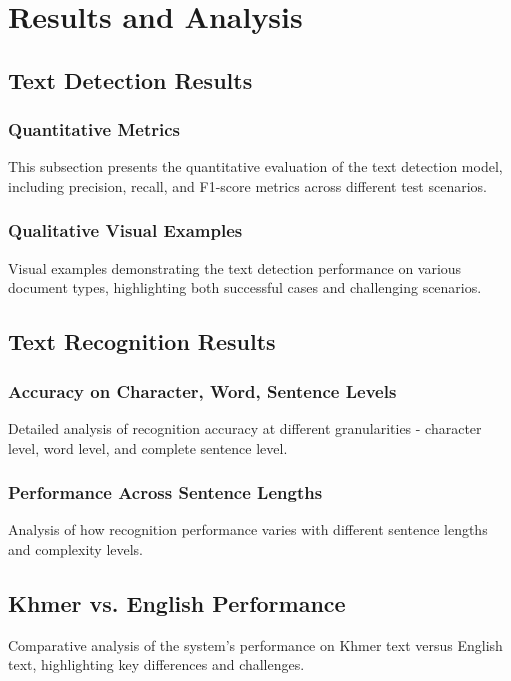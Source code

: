 \chapter{Results and Analysis}
\label{ch:results}

\section{Text Detection Results}
\label{sec:detection-results}

\subsection{Quantitative Metrics}
\label{subsec:quantitative}
This subsection presents the quantitative evaluation of the text detection model, including precision, recall, and F1-score metrics across different test scenarios.

\subsection{Qualitative Visual Examples} 
\label{subsec:qualitative}
Visual examples demonstrating the text detection performance on various document types, highlighting both successful cases and challenging scenarios.

\section{Text Recognition Results}
\label{sec:recognition-results}

\subsection{Accuracy on Character, Word, Sentence Levels}
\label{subsec:accuracy}
Detailed analysis of recognition accuracy at different granularities - character level, word level, and complete sentence level.

\subsection{Performance Across Sentence Lengths}
\label{subsec:performance}
Analysis of how recognition performance varies with different sentence lengths and complexity levels.

\section{Khmer vs. English Performance}
\label{sec:comparison-results}
Comparative analysis of the system's performance on Khmer text versus English text, highlighting key differences and challenges.


